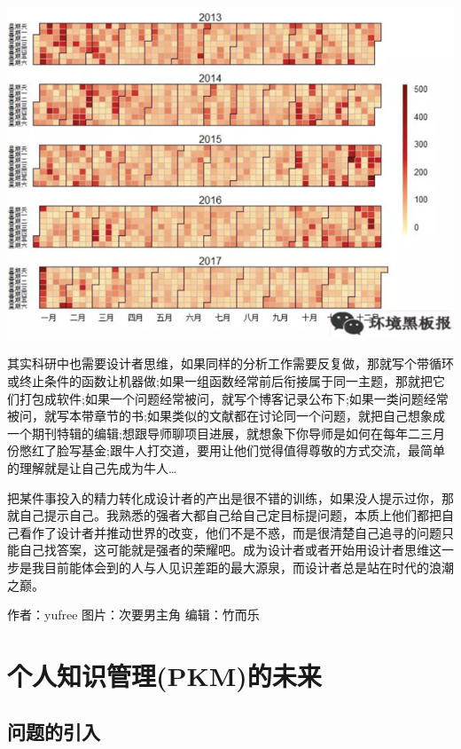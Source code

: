 \documentclass[]{book}
\begin{document}
\includegraphics[width=8.33in]{images/sheji5}

其实科研中也需要设计者思维，如果同样的分析工作需要反复做，那就写个带循环或终止条件的函数让机器做;如果一组函数经常前后衔接属于同一主题，那就把它们打包成软件;如果一个问题经常被问，就写个博客记录公布下;如果一类问题经常被问，就写本带章节的书;如果类似的文献都在讨论同一个问题，就把自己想象成一个期刊特辑的编辑;想跟导师聊项目进展，就想象下你导师是如何在每年二三月份憋红了脸写基金;跟牛人打交道，要用让他们觉得值得尊敬的方式交流，最简单的理解就是让自己先成为牛人\ldots{}

把某件事投入的精力转化成设计者的产出是很不错的训练，如果没人提示过你，那就自己提示自己。我熟悉的强者大都自己给自己定目标提问题，本质上他们都把自己看作了设计者并推动世界的改变，他们不是不惑，而是很清楚自己追寻的问题只能自己找答案，这可能就是强者的荣耀吧。成为设计者或者开始用设计者思维这一步是我目前能体会到的人与人见识差距的最大源泉，而设计者总是站在时代的浪潮之巅。

作者：yufree
图片：次要男主角
编辑：竹而乐

\hypertarget{ux4e2aux4ebaux77e5ux8bc6ux7ba1ux7406pkmux7684ux672aux6765}{%
\section{个人知识管理(PKM)的未来}\label{ux4e2aux4ebaux77e5ux8bc6ux7ba1ux7406pkmux7684ux672aux6765}}

\hypertarget{ux95eeux9898ux7684ux5f15ux5165}{%
\subsection{问题的引入}\label{ux95eeux9898ux7684ux5f15ux5165}}
\end{document}
